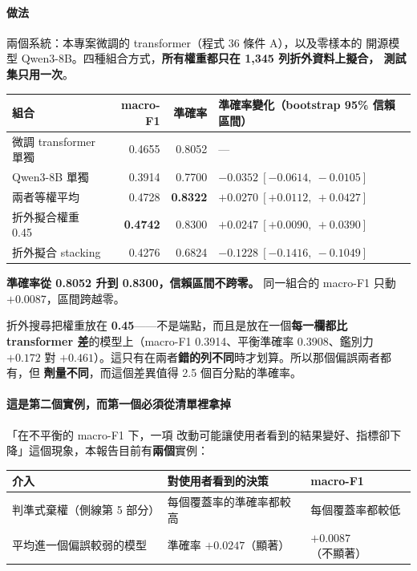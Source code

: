 \documentclass[11pt,a4paper]{ctexart}
\begin{document}
\paragraph{做法} 兩個系統：本專案微調的 transformer（程式 36 條件 A），以及零樣本的
開源模型 Qwen3-8B。四種組合方式，\textbf{所有權重都只在 1{,}345 列折外資料上擬合，
測試集只用一次}。

\begin{table}[h]
\centering\small
\begin{tabular}{@{}lrrl@{}}
\toprule
組合 & macro-F1 & 準確率 & 準確率變化（bootstrap 95\% 信賴區間） \\
\midrule
微調 transformer 單獨 & 0.4655 & 0.8052 & --- \\
Qwen3-8B 單獨 & 0.3914 & 0.7700 & $-0.0352\ [-0.0614,\ -0.0105]$ \\
\rowcolor{green!12}
兩者等權平均 & 0.4728 & \textbf{0.8322} & $\mathbf{+0.0270\ [+0.0112,\ +0.0427]}$ \\
\rowcolor{green!12}
折外擬合權重 0.45 & \textbf{0.4742} & 0.8300 & $\mathbf{+0.0247\ [+0.0090,\ +0.0390]}$ \\
折外擬合 stacking & 0.4276 & 0.6824 & $-0.1228\ [-0.1416,\ -0.1049]$ \\
\bottomrule
\end{tabular}
\end{table}

\begin{tcolorbox}[colback=green!5, colframe=green!45, title=準確率確實上升，而 macro-F1 沒有記錄它]
\textbf{準確率從 0.8052 升到 0.8300，信賴區間不跨零。} 同一組合的 macro-F1 只動
$+0.0087$，區間跨越零。

\medskip
折外搜尋把權重放在 \textbf{0.45}——不是端點，而且是放在一個\textbf{每一欄都比
transformer 差}的模型上（macro-F1 0.3914、平衡準確率 0.3908、鑑別力 $+0.172$ 對
$+0.461$）。這只有在兩者\textbf{錯的列不同}時才划算。所以那個偏誤兩者都有，但
\textbf{劑量不同}，而這個差異值得 2.5 個百分點的準確率。
\end{tcolorbox}

\paragraph{這是第二個實例，而第一個必須從清單裡拿掉} 「在不平衡的 macro-F1 下，一項
改動可能讓使用者看到的結果變好、指標卻下降」這個現象，本報告目前有\textbf{兩個}實例：

\begin{table}[h]
\centering\small
\begin{tabular}{@{}lll@{}}
\toprule
介入 & 對使用者看到的決策 & macro-F1 \\
\midrule
判準式棄權（側線第 5 部分） & 每個覆蓋率的準確率都較高 & 每個覆蓋率都較低 \\
\rowcolor{yellow!15}
平均進一個偏誤較弱的模型 & 準確率 $+0.0247$（顯著） & $+0.0087$（不顯著） \\
\bottomrule
\end{tabular}
\end{table}
\end{document}
